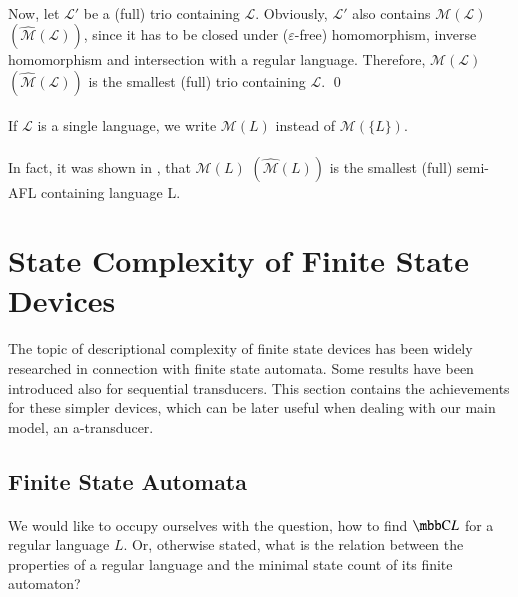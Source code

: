 \paragraph{}
Now, let $\mathcal{L'} $ be a (full) trio containing $\mathcal{L} $. Obviously, $\mathcal{L'} $ also contains $\mathcal{M(L)} $ $(\mathcal{\hat{M}(L)}) $, since it has to be closed under ($\varepsilon $-free) homomorphism, inverse homomorphism and intersection with a regular language. Therefore, $\mathcal{M(L)} $ $(\mathcal{\hat{M}(L)}) $ is the smallest (full) trio containing $\mathcal{L} $. \qed

\paragraph{}
\oznacenie If $\mathcal{L}$ is a single language, we write $\mathcal{M}(L)$ instead of $\mathcal{M}(\{ L\} )$.

\paragraph{}
In fact, it was shown in \cite{gingrei:pAFL}, that $\mathcal{M}(L) $ $(\mathcal{\hat{M}}(L)) $ is the smallest (full) semi-AFL containing language L.

\section{State Complexity of Finite State Devices}
\paragraph{}
The topic of descriptional complexity of finite state devices has been widely researched in connection with finite state automata. Some results have been introduced also for sequential transducers. This section contains the achievements for these simpler devices, which can be later useful when dealing with our main model, an a-transducer.

\subsection{Finite State Automata}
\paragraph{}
We would like to occupy ourselves with the question, how to find $\C{L}$ for a regular language $L$. Or, otherwise stated, what is the relation between the properties of a regular language and the minimal state count of its finite automaton?

